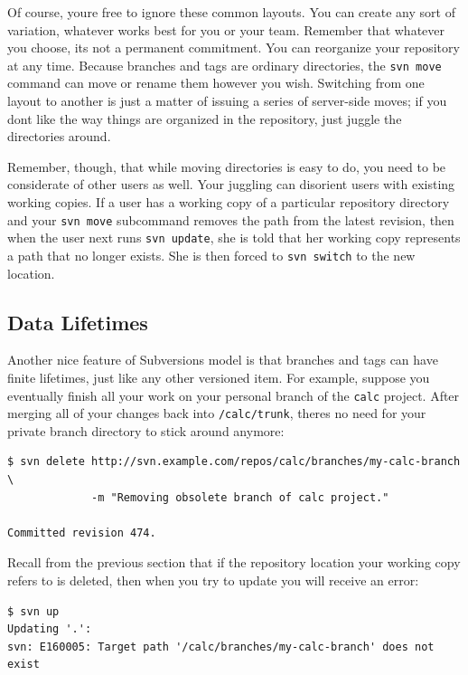 Of course, you\textquotesingle re free to ignore these common layouts.
You can create any sort of variation, whatever works best for you or
your team. Remember that whatever you choose, it\textquotesingle s not a
permanent commitment. You can reorganize your repository at any time.
Because branches and tags are ordinary directories, the
\texttt{svn\ move} command can move or rename them however you wish.
Switching from one layout to another is just a matter of issuing a
series of server-side moves; if you don\textquotesingle t like the way
things are organized in the repository, just juggle the directories
around.

Remember, though, that while moving directories is easy to do, you need
to be considerate of other users as well. Your juggling can disorient
users with existing working copies. If a user has a working copy of a
particular repository directory and your \texttt{svn\ move} subcommand
removes the path from the latest revision, then when the user next runs
\texttt{svn\ update}, she is told that her working copy represents a
path that no longer exists. She is then forced to \texttt{svn\ switch}
to the new location.

\subsection{Data Lifetimes}\label{svn.branchmerge.maint.lifetime}

Another nice feature of Subversion\textquotesingle s model is that
branches and tags can have finite lifetimes, just like any other
versioned item. For example, suppose you eventually finish all your work
on your personal branch of the \texttt{calc} project. After merging all
of your changes back into \texttt{/calc/trunk}, there\textquotesingle s
no need for your private branch directory to stick around anymore:

\begin{verbatim}
$ svn delete http://svn.example.com/repos/calc/branches/my-calc-branch \
             -m "Removing obsolete branch of calc project."

Committed revision 474.
\end{verbatim}

Recall from the previous section that if the repository location your
working copy refers to is deleted, then when you try to update you will
receive an error:

\begin{verbatim}
$ svn up
Updating '.':
svn: E160005: Target path '/calc/branches/my-calc-branch' does not exist
\end{verbatim}

